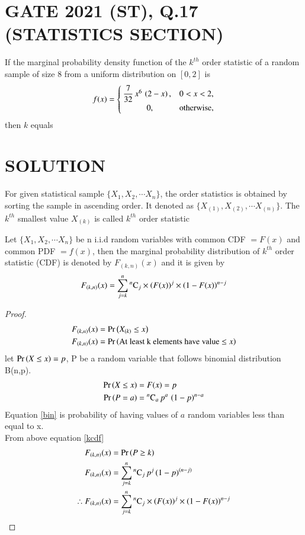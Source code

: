\documentclass[journal,12pt,twocolumn]{IEEEtran}
\begin{document}
\section{GATE 2021 (ST), Q.17 (STATISTICS SECTION)} 
If the marginal probability density function of the $k^{th}$ order statistic of a 
random sample of size 8 from a uniform distribution on $[0,2]$ is
\begin{align}
  f(x) =
  \begin{cases}
   \dfrac{7}{32}\,x^{6}\,\left(2-x\right),  & 0<x<2, \\ 
      \hspace{1cm}   0,               & \text{otherwise,} 
  \end{cases}
\label{qnpdf}
\end{align}
then $k$ equals \underline{\hspace{3cm}}
\vspace{0.2cm}
\section{SOLUTION}
\begin{definition}
For given statistical sample $\{X_1, X_2,\cdots X_n\}$, the order statistics is obtained by sorting the
sample in ascending order. It denoted as $\{X_{(1)}, X_{(2)},\cdots X_{(n)}\}$. The $k^{th}$ smallest value
$X_{(k)}$ is called  $k^{th}$ order statistic 
\end{definition}
\begin{theorem}
Let $\{X_1, X_2, \cdots X_n\}$ be n i.i.d random variables with common CDF $= F(x)$ and common PDF $= f(x)$, 
then the marginal probability distribution of $k^{th}$ order statistic (CDF) is denoted by $F_{(k,n)}(x)$ 
and it is given by
\begin{align}
F_{(k,n)}(x) =  \sum_{j=k}^{n}{}^{n}\mathrm{C}_{j}\times \left(F(x)\right)^{j}\times\left(1-F(x)\right)^{n-j} \label{eqn_1}
\end{align}
\label{th1}
\end{theorem}
\begin{proof}
\begin{align}
F_{(k,n)}(x) &= \Pr\left(X_{(k)}\leq x\right) \\
F_{(k,n)}(x) &= \Pr\left(\text{At least k elements have value $\leq x$}\right) \label{kcdf}
\end{align}
let $\Pr\left(X\leq x\right) = p$, P be a random variable that follows binomial distribution B(n,p). 
\begin{align}
\Pr\left(X\leq x\right) &= F(x) = p \\
\Pr\left(P=a\right) &= {}^{n}\mathrm{C}_{a}\,p^{a}\,\left(1-p\right)^{n-a} \label{bin} 
\end{align}
Equation \eqref{bin} is probability of having values of $a$ random variables less than equal to x.  \\
From above equation \eqref{kcdf}
\begin{align}
F_{(k,n)}(x) &= \Pr\left(P\geq k\right) \\
F_{(k,n)}(x) &=\sum_{j=k}^{n}{}^{n}\mathrm{C}_{j}\,p^{j}\,(1-p)^{(n-j)} \\
\therefore F_{(k,n)}(x) &=  \sum_{j=k}^{n}{}^{n}\mathrm{C}_{j}\times \left(F(x)\right)^{j}\times\left(1-F(x)\right)^{n-j} 
\end{align}
\end{proof}
\end{document}
